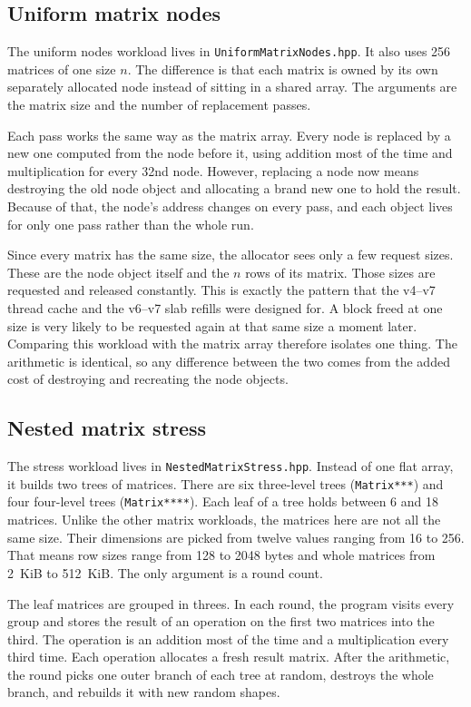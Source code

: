 \subsection{Uniform matrix nodes}

The uniform nodes workload lives in
\texttt{Uniform\allowbreak Matrix\allowbreak Nodes.hpp}.
It also uses 256 matrices of one size $n$.
The difference is that each matrix is owned by its own separately allocated
node instead of sitting in a shared array.
The arguments are the matrix size and the number of replacement passes.

Each pass works the same way as the matrix array.
Every node is replaced by a new one computed from the node before it, using
addition most of the time and multiplication for every 32nd node.
However, replacing a node now means destroying the old node object and
allocating a brand new one to hold the result.
Because of that, the node's address changes on every pass, and each object
lives for only one pass rather than the whole run.

Since every matrix has the same size, the allocator sees only a few request
sizes.
These are the node object itself and the $n$ rows of its matrix.
Those sizes are requested and released constantly.
This is exactly the pattern that the v4--v7 thread cache and the v6--v7 slab
refills were designed for.
A block freed at one size is very likely to be requested again at that same
size a moment later.
Comparing this workload with the matrix array therefore isolates one thing.
The arithmetic is identical, so any difference between the two comes from the
added cost of destroying and recreating the node objects.

\subsection{Nested matrix stress}

The stress workload lives in
\texttt{Nested\allowbreak Matrix\allowbreak Stress.hpp}.
Instead of one flat array, it builds two trees of matrices.
There are six three-level trees (\texttt{Matrix***}) and four four-level trees
(\texttt{Matrix****}).
Each leaf of a tree holds between 6 and 18 matrices.
Unlike the other matrix workloads, the matrices here are not all the same
size.
Their dimensions are picked from twelve values ranging from 16 to 256.
That means row sizes range from 128 to 2048 bytes and whole matrices from
2~KiB to 512~KiB.
The only argument is a round count.

The leaf matrices are grouped in threes.
In each round, the program visits every group and stores the result of an
operation on the first two matrices into the third.
The operation is an addition most of the time and a multiplication every third
time.
Each operation allocates a fresh result matrix.
After the arithmetic, the round picks one outer branch of each tree at random,
destroys the whole branch, and rebuilds it with new random shapes.

